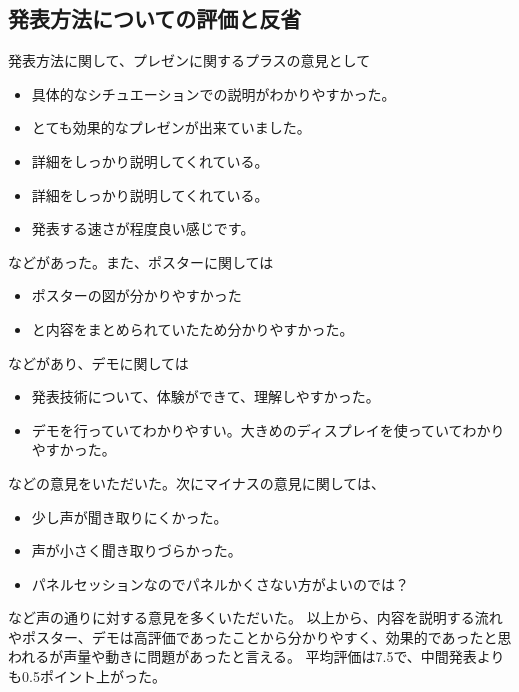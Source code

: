 \documentclass[openany,11pt,papersize]{jsbook}
\begin{document}
\subsection{発表方法についての評価と反省}
発表方法に関して、プレゼンに関するプラスの意見として
\begin{itemize}

\item 具体的なシチュエーションでの説明がわかりやすかった。
\item とても効果的なプレゼンが出来ていました。
\item 詳細をしっかり説明してくれている。
\item 詳細をしっかり説明してくれている。
\item 発表する速さが程度良い感じです。

\end{itemize}

などがあった。また、ポスターに関しては
\begin{itemize}

\item ポスターの図が分かりやすかった
\item と内容をまとめられていたため分かりやすかった。

\end{itemize}

などがあり、デモに関しては
\begin{itemize}

\item 発表技術について、体験ができて、理解しやすかった。
\item デモを行っていてわかりやすい。大きめのディスプレイを使っていてわかりやすかった。

\end{itemize}

などの意見をいただいた。次にマイナスの意見に関しては、
\begin{itemize}

\item 少し声が聞き取りにくかった。
\item 声が小さく聞き取りづらかった。
\item パネルセッションなのでパネルかくさない方がよいのでは？

\end{itemize}
など声の通りに対する意見を多くいただいた。
以上から、内容を説明する流れやポスター、デモは高評価であったことから分かりやすく、効果的であったと思われるが声量や動きに問題があったと言える。
平均評価は7.5で、中間発表よりも0.5ポイント上がった。
\end{document}

